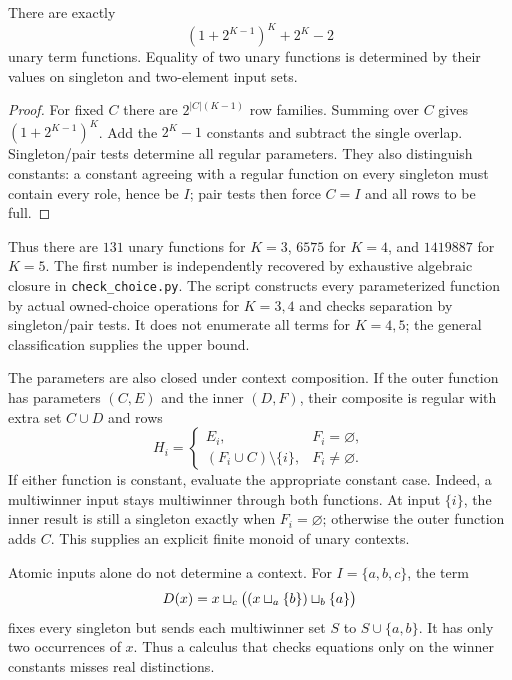 \begin{corollary}
There are exactly
\begin{equation}\label{game:eq:count}
  (1+2^{K-1})^K+2^K-2
\end{equation}
unary term functions. Equality of two unary functions is determined by
their values on singleton and two-element input sets.
\end{corollary}
\begin{proof}
For fixed $C$ there are $2^{|C|(K-1)}$ row families. Summing over $C$
gives $(1+2^{K-1})^K$. Add the $2^K-1$ constants and subtract the single
overlap. Singleton/pair tests determine all regular parameters. They
also distinguish constants: a constant agreeing with a regular function
on every singleton must contain every role, hence be $I$; pair tests
then force $C=I$ and all rows to be full.
\end{proof}

Thus there are $131$ unary functions for $K=3$, $6575$ for $K=4$, and
$1419887$ for $K=5$. The first number is independently recovered by
exhaustive algebraic closure in \texttt{check\_choice.py}. The script constructs
every parameterized function by actual owned-choice operations for
$K=3,4$ and checks separation by singleton/pair tests. It does not
enumerate all terms for $K=4,5$; the general classification supplies the
upper bound.

The parameters are also closed under context composition. If the outer
function has parameters $(C,E)$ and the inner $(D,F)$, their composite is
regular with extra set $C\cup D$ and rows
\[
 H_i=\begin{cases}
 E_i,&F_i=\varnothing,\\
 (F_i\cup C)\setminus\{i\},&F_i\ne\varnothing.
 \end{cases}
\]
If either function is constant, evaluate the appropriate constant case.
Indeed, a multiwinner input stays multiwinner through both functions. At
input $\{i\}$, the inner result is still a singleton exactly when
$F_i=\varnothing$; otherwise the outer function adds $C$.
This supplies an explicit finite monoid of unary contexts.

Atomic inputs alone do not determine a context. For $I=\{a,b,c\}$, the term
\begin{equation}\label{game:eq:D}
 D(x)=x\mathbin{\sqcup_{c}}\bigl((x\mathbin{\sqcup_{a}}\{b\})\mathbin{\sqcup_{b}}\{a\}\bigr)
\end{equation}
fixes every singleton but sends each multiwinner set $S$ to
$S\cup\{a,b\}$. It has only two occurrences of $x$. Thus a calculus that
checks equations only on the winner constants misses real distinctions.

